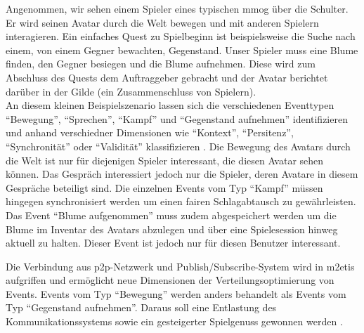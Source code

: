 \label{chap:grundlagen:szenario}
Angenommen, wir sehen einem Spieler eines typischen \ac{mmog} über die Schulter. Er wird seinen Avatar durch die Welt bewegen und mit anderen Spielern interagieren. Ein einfaches Quest zu Spielbeginn ist beispielsweise die Suche nach einem, von einem Gegner bewachten, Gegenstand. Unser Spieler muss eine Blume finden, den Gegner besiegen und die Blume aufnehmen. Diese wird zum Abschluss des Quests dem Auftraggeber gebracht und der Avatar berichtet darüber in der Gilde (ein Zusammenschluss von Spielern).\\
An diesem kleinen Beispielszenario lassen sich die verschiedenen Eventtypen \enquote{Bewegung'', ``Sprechen'', ``Kampf'' und ``Gegenstand aufnehmen'' identifizieren und anhand verschiedner Dimensionen wie ``Kontext'', ``Persitenz'', ``Synchronität'' oder ``Validität'' klassifizieren \cite{Fischer2010Event}. Die Bewegung des Avatars durch die Welt ist nur für diejenigen Spieler interessant, die diesen Avatar sehen können. Das Gespräch interessiert jedoch nur die Spieler, deren Avatare in diesem Gespräche beteiligt sind. Die einzelnen Events vom Typ ``Kampf'' müssen hingegen synchronisiert werden um einen fairen Schlagabtausch zu gewährleisten. Das Event ``Blume aufgenommen} muss zudem abgespeichert werden um die Blume im Inventar des Avatars abzulegen und über eine Spielesession hinweg aktuell zu halten. Dieser Event ist jedoch nur für diesen Benutzer interessant.


Die Verbindung aus \ac{p2p}-Netzwerk und Publish/Subscribe-System wird in \ac{m2etis} aufgriffen und ermöglicht neue Dimensionen der Verteilungsoptimierung von Events. Events vom Typ \enquote{Bewegung'' werden anders behandelt als Events vom Typ ``Gegenstand aufnehmen}. Daraus soll eine Entlastung des Kommunikationssystems sowie ein gesteigerter Spielgenuss gewonnen werden  \cite{Fischer2010a}.
